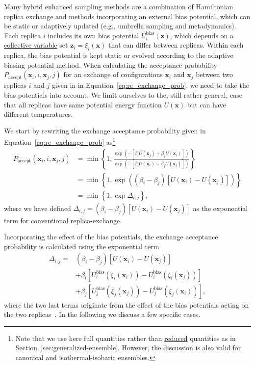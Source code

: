 \documentclass[9pt,review]{livecoms}
\newcommand{\vx}{\mathbf{x}}
\newcommand{\vz}{\mathbf{z}}
\begin{document}
Many hybrid enhanced sampling methods are a combination of Hamiltonian replica exchange and methods incorporating an external bias potential, which can be static or adaptively updated (e.g., umbrella sampling and metadynamics). Each replica $i$ includes its own bias potential $U^{\mathrm{bias}}_{i}(\vz)$, which depends on a \hyperlink{ref:CV} {collective variable} set $\vz_{i} = \xi_{i}(\vx)$ that can differ between replicas. Within each replica, the bias potential is kept static or evolved according to the adaptive biasing potential method. When calculating the acceptance probability $P_\mathrm{accept}(\vx_i, i, \vx_j, j)$ for an exchange of configurations $\vx_{i}$ and $\vx_{j}$ between two replicas $i$ and $j$ given in in Equation~\ref{eq:re_exchange_prob}, we need to take the bias potentials into account. We limit ourselves to the, still rather general, case that all replicas have same potential energy function $U(\vx)$ but can have different temperatures.

We start by rewriting the exchange acceptance probability given in Equation~\ref{eq:re_exchange_prob}
as\footnote{Note that we use here full quantities rather than \hyperlink{ref:reduced} {reduced} quantities as in Section~\ref{sec:generalized-ensemble}. However, the discussion is also valid for canonical and isothermal-isobaric ensembles.}
\begin{align}
\label{eq:replexc_acceptance probability}
P_\mathrm{accept}(\vx_i, i, \vx_j, j) &=
\min\left\{1,\frac{\exp(-[\beta_{i}U(\vx_j)+\beta_{j}U(\vx_i)])}{\exp(-[\beta_{i}U(\vx_i)+\beta_{j}U(\vx_j)])}\right\}
\nonumber \\
&=
\min\left\{1,\exp\left(\left(\beta_{i} - \beta_{j}\right)
\left[U(\vx_{i}) - U(\vx_{j})\right]\right)\right\}
\nonumber \\
&=
\min\left\{1,\exp \Delta_{i,j}\right\},
\end{align}
where we have defined $\Delta_{i,j}=\left(\beta_{i} - \beta_{j}\right)
\left[U(\vx_{i}) - U(\vx_{j})\right]
$ as the exponential term for conventional replica-exchange.

Incorporating the effect of the bias potentials, the exchange acceptance probability is calculated using the exponential term
\begin{align}
\Delta_{i,j} = &
\left(\beta_{i} - \beta_{j}\right)
\left[U(\vx_{i}) - U(\vx_{j})\right]
\nonumber \\ & +
\beta_{i} \left[
U^{\mathrm{bias}}_{i}(\xi_{i}(\vx_{i})) - U^{\mathrm{bias}}_{i}(\xi_{i}(\vx_{j}))
\right]
\nonumber \\ & +
\beta_{j} \left[
U^{\mathrm{bias}}_{j}(\xi_{j}(\vx_{j})) - U^{\mathrm{bias}}_{j}(\xi_{j}(\vx_{i}))
\right],
\end{align}
where the two last terms originate from the effect of the bias potentials acting on the two replicas~\cite{Bussi-JACS-2006}. In the following we discuss a few specific cases.
\end{document}
